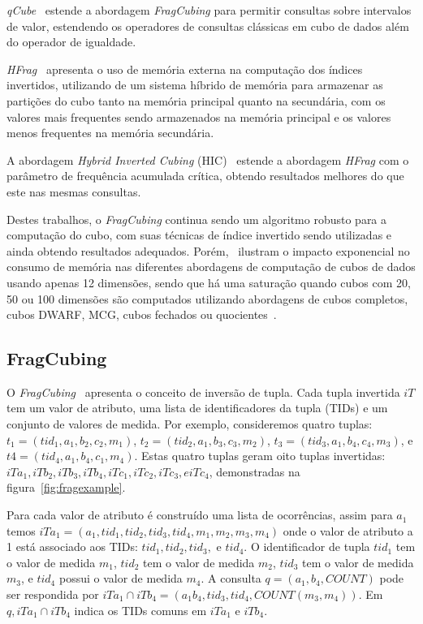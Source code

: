 \textit{qCube}~\cite{silvaQCubeEfficientIntegration2013} estende a abordagem \textit{FragCubing} para permitir consultas sobre intervalos de valor, estendendo os operadores de consultas clássicas em cubo de dados além do operador de igualdade.

\textit{HFrag}~\cite{silvaHybridMemoryData2015} apresenta o uso de memória externa na computação dos índices invertidos, utilizando de um sistema híbrido de memória para armazenar as partições do cubo tanto na memória principal quanto na secundária, com os valores mais frequentes sendo armazenados na memória principal e os valores menos frequentes na memória secundária.

A abordagem \textit{Hybrid Inverted Cubing} (HIC)~\cite{silvaComputingBIGData2016} estende a abordagem \textit{HFrag} com o parâmetro de frequência acumulada crítica, obtendo resultados melhores do que este nas mesmas consultas.

Destes trabalhos, o \textit{FragCubing} continua sendo um algoritmo robusto para a computação do cubo, com suas técnicas de índice invertido sendo utilizadas e ainda obtendo resultados adequados.
Porém,~ ilustram o impacto exponencial no consumo de memória nas diferentes abordagens de computação de cubos de dados usando apenas 12 dimensões, sendo que há uma saturação quando cubos com 20, 50 ou 100 dimensões são computados utilizando abordagens de cubos completos, cubos DWARF, MCG, cubos fechados ou quocientes~\cite{silva:2015:abordagensParaCubo}.

\subsection{FragCubing}\label{ch:corr:cube:frag}

O \textit{FragCubing}~\cite{liHighdimensionalOLAPMinimal2004} apresenta o conceito de inversão de tupla.
Cada tupla invertida $iT$ tem um valor de atributo, uma lista de identificadores da tupla (TIDs) e um conjunto de valores de medida.
Por exemplo, consideremos quatro tuplas: $t_1 = (tid_1, a_1, b_2, c_2, m_1)$, $t_2 = (tid_2, a_1, b_3, c_3, m_2)$, $t_3 = (tid_3, a_1, b_4, c_4, m_3)$, e $t4 = (tid_4, a_1, b_4, c_1, m_4)$.
Estas quatro tuplas geram oito tuplas invertidas: $iTa_1, iTb_2, iTb_3, iTb_4, iTc_1, iTc_2, iTc_3, e iTc_4$, demonstradas na figura~\ref{fig:fragexample}.

Para cada valor de atributo é construído uma lista de ocorrências, assim para $a_1$ temos $iTa_1 = (a_1, tid_1, tid_2, tid_3, tid_4, m_1, m_2, m_3, m_4)$ onde o valor de atributo a 1 está associado aos TIDs: $tid_1, tid_2, tid_3,$ e $tid_4$.
O identificador de tupla $tid_1$ tem o valor de medida $m_1$, $tid_2$ tem o valor de medida $m_2$, $tid_3$ tem o valor de medida $m_3$, e $tid_4$ possui o valor de medida $m_4$.
A consulta $q = (a_1, b_4, COUNT)$ pode ser respondida por $iTa_1 \cap iTb_4 = (a_1b_4, tid_3, tid_4, COUNT(m_3, m_4))$.
Em $q, iTa_1 \cap iTb_4$ indica os TIDs comuns em $iTa_1$ e $iTb_4$.

